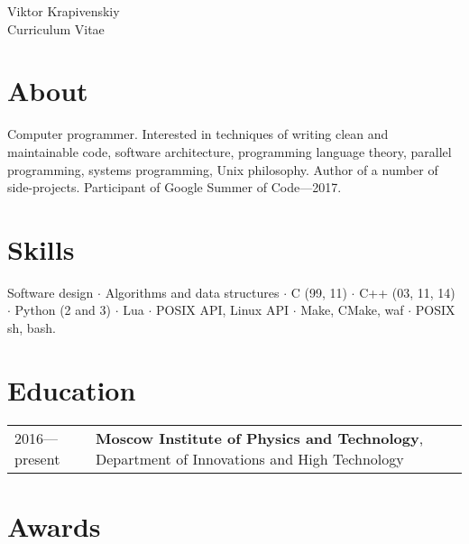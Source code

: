 \documentclass[10pt]{article}
\begin{document}
\parbox[top][0.12\textheight][c]{\linewidth}{
    \vspace{-0.04\textheight}
    \centering
    {\sffamily\Huge Viktor Krapivenskiy}\\\medskip
    {\Huge Curriculum Vitae}
}

\medskip

\section{About}

Computer programmer.
Interested in
  techniques of writing clean and maintainable code,
  software architecture,
  programming language theory,
  parallel programming,
  systems programming,
  Unix philosophy.
Author of a number of side-projects.
Participant of Google Summer of Code---2017.

\medskip

\section{Skills}

Software design $\cdot$
Algorithms and data structures $\cdot$
C (99, 11) $\cdot$
C++ (03, 11, 14) $\cdot$
Python (2 and 3) $\cdot$
Lua $\cdot$
POSIX API, Linux API $\cdot$
Make, CMake, waf $\cdot$
POSIX sh, bash.

\medskip

\section{Education}

\begin{tabular}{ l l }
    2016---present & \textbf{Moscow Institute of Physics and Technology}, Department of Innovations and High Technology \\
\end{tabular}

\medskip

\section{Awards}
\end{document}
